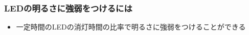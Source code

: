\begin{frame}
    \frametitle{LEDの明るさに強弱をつけるには}
    \begin{center}
        \begin{figure}
            
        \end{figure}
        \begin{itemize}
            \item 一定時間のLEDの消灯時間の比率で明るさに強弱をつけることができる
        \end{itemize}
    \end{center}
\end{frame}